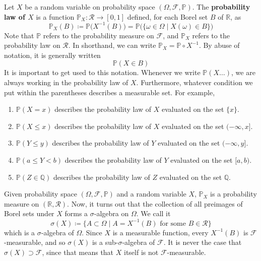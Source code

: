  \begin{definition}
    Let $X$ be a random variable on probability space $(\Omega, \mathcal{F}, \mathbb{P})$. The \textbf{probability law of $X$} is a function $\mathbb{P}_X : \mathcal{R} \longrightarrow [0, 1]$ defined, for each Borel set $B$ of $\mathbb{R}$, as 
    \begin{equation}
      \mathbb{P}_X (B) \coloneqq \mathbb{P} \big( X^{-1}(B) \big) = \mathbb{P} \big( \{\omega \in \Omega \mid X(\omega) \in B\} \big)
    \end{equation}
    Note that $\mathbb{P}$ refers to the probability measure on $\mathcal{F}$, and $\mathbb{P}_X$ refers to the probability law on $\mathcal{R}$. In shorthand, we can write $\mathbb{P}_X = \mathbb{P} \circ X^{-1}$. By abuse of notation, it is generally written
    \begin{equation}
      \mathbb{P}(X \in B)
    \end{equation}
    It is important to get used to this notation. Whenever we write $\mathbb{P}(X \ldots)$, we are always working in the probability law of $X$. Furthermore, whatever condition we put within the parentheses describes a measurable set. For example, 
    \begin{enumerate}
      \item $\mathbb{P}(X = x)$ describes the probability law of $X$ evaluated on the set $\{x\}$. 
      \item $\mathbb{P}(X \leq x)$ describes the probability law of $X$ evaluated on the set $(-\infty, x]$. 
      \item $\mathbb{P}(Y \leq y)$ describes the probability law of $Y$ evaluated on the set $(-\infty, y]$.
      \item $\mathbb{P}(a \leq Y < b)$ describes the probability law of $Y$ evaluated on the set $[a, b)$. 
      \item $\mathbb{P}(Z \in \mathbb{Q})$ describes the probability law of $Z$ evaluated on the set $\mathbb{Q}$. 
    \end{enumerate}
  \end{definition}

  \begin{theorem}
    Given probability space $(\Omega, \mathcal{F}, \mathbb{P})$ and a random variable $X$, $\mathbb{P}_X$ is a probability measure on $(\mathbb{R}, \mathcal{R})$. Now, it turns out that the collection of all preimages of Borel sets under $X$ forms a $\sigma$-algebra on $\Omega$. We call it 
    \begin{equation}
      \sigma(X) \coloneqq \big\{ A \subset \Omega \mid A = X^{-1}(B) \text{ for some } B \in \mathcal{R} \big\}
    \end{equation}
    which is a $\sigma$-algebra of $\Omega$. Since $X$ is a measurable function, every $X^{-1}(B)$ is $\mathcal{F}$-measurable, and so $\sigma(X)$ is a sub-$\sigma$-algebra of $\mathcal{F}$. It is never the case that $\sigma(X) \supset \mathcal{F}$, since that means that $X$ itself is not $\mathcal{F}$-measurable. 
  \end{theorem}

